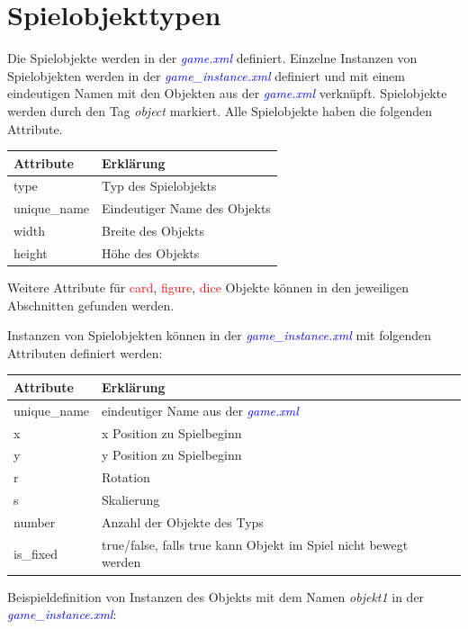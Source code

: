 \documentclass[ngerman]{scrbook}
\newcommand{\gamefile}[1]{\textit{\textcolor{blue}{#1}}\xspace}
\newcommand{\game}{\gamefile{game.xml}}
\newcommand{\gameinstance}{\gamefile{game\_instance.xml}}
\newcommand{\card}{\textcolor{red}{card}\xspace}
\newcommand{\gamefigure}{\textcolor{red}{figure}\xspace}
\newcommand{\dice}{\textcolor{red}{dice}\xspace}
\begin{document}
	\section{Spielobjekttypen}
	
	Die Spielobjekte werden in der \game definiert. Einzelne Instanzen von Spielobjekten werden in der \gameinstance definiert und mit einem eindeutigen Namen mit den Objekten aus der \game verknüpft. Spielobjekte werden durch den Tag \textit{object} markiert. Alle Spielobjekte haben die folgenden Attribute.
	
	\begin{table}[!h]
		\renewcommand{\arraystretch}{1.5}
		\begin{tabularx}{\textwidth}{XX}
			Attribute & Erklärung\\\hline
			type & Typ des Spielobjekts\\
			unique\_name & Eindeutiger Name des Objekts\\
			width & Breite des Objekts\\
			height & Höhe des Objekts\\
		\end{tabularx}
	\end{table}

	Weitere Attribute für \card, \gamefigure, \dice Objekte können in den jeweiligen Abschnitten gefunden werden.

	Instanzen von Spielobjekten können in der \gameinstance mit folgenden Attributen definiert werden:
	
	\begin{table}[!h]
		\renewcommand{\arraystretch}{1.5}		\begin{tabularx}{\textwidth}{XXX}
			Attribute & Erklärung\\\hline
			unique\_name & eindeutiger Name aus der \game\\
			x & x Position zu Spielbeginn\\
			y & y Position zu Spielbeginn\\
			r & Rotation\\
			s & Skalierung\\
			number & Anzahl der Objekte des Typs\\
			is\_fixed & true/false, falls true kann Objekt im Spiel nicht bewegt werden\\
		\end{tabularx}
	\end{table}

	Beispieldefinition von Instanzen des Objekts mit dem Namen \textit{objekt1} in der \gameinstance:
	
\end{document}
